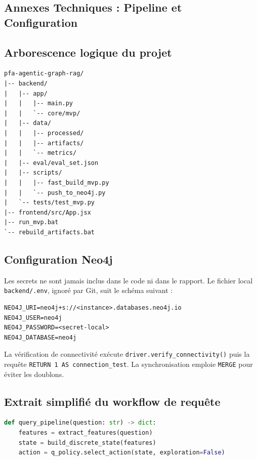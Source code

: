 \documentclass[12pt,a4paper,oneside]{report}
\newcommand{\tech}[1]{\texttt{#1}}
\begin{document}
\begin{appendices}
\chapter{Annexes Techniques : Pipeline et Configuration}

\section{Arborescence logique du projet}
\begin{lstlisting}[style=code]
pfa-agentic-graph-rag/
|-- backend/
|   |-- app/
|   |   |-- main.py
|   |   `-- core/mvp/
|   |-- data/
|   |   |-- processed/
|   |   |-- artifacts/
|   |   `-- metrics/
|   |-- eval/eval_set.json
|   |-- scripts/
|   |   |-- fast_build_mvp.py
|   |   `-- push_to_neo4j.py
|   `-- tests/test_mvp.py
|-- frontend/src/App.jsx
|-- run_mvp.bat
`-- rebuild_artifacts.bat
\end{lstlisting}

\section{Configuration Neo4j}
Les secrets ne sont jamais inclus dans le code ni dans le rapport. Le fichier local \tech{backend/.env}, ignoré par Git, suit le schéma suivant :
\begin{lstlisting}[style=code]
NEO4J_URI=neo4j+s://<instance>.databases.neo4j.io
NEO4J_USER=neo4j
NEO4J_PASSWORD=<secret-local>
NEO4J_DATABASE=neo4j
\end{lstlisting}

La vérification de connectivité exécute \tech{driver.verify\_connectivity()} puis la requête \tech{RETURN 1 AS connection\_test}. La synchronisation emploie \tech{MERGE} pour éviter les doublons.

\section{Extrait simplifié du workflow de requête}
\begin{lstlisting}[style=code,language=Python]
def query_pipeline(question: str) -> dict:
    features = extract_features(question)
    state = build_discrete_state(features)
    action = q_policy.select_action(state, exploration=False)


\end{lstlisting}
\end{appendices}
\end{document}
